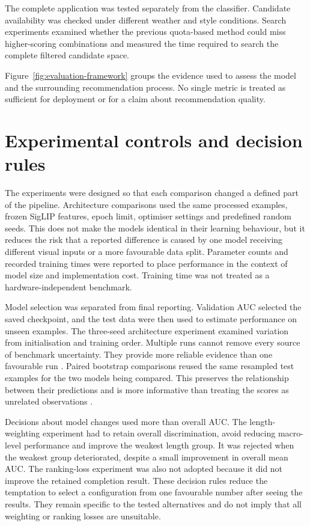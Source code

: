 The complete application was tested separately from the classifier. Candidate
availability was checked under different weather and style conditions. Search
experiments examined whether the previous quota-based method could miss
higher-scoring combinations and measured the time required to search the
complete filtered candidate space.

Figure~\ref{fig:evaluation-framework} groups the evidence used to assess the
model and the surrounding recommendation process. No single metric is treated
as sufficient for deployment or for a claim about recommendation quality.



\section{Experimental controls and decision rules}

The experiments were designed so that each comparison changed a defined part
of the pipeline. Architecture comparisons used the same processed examples,
frozen SigLIP features, epoch limit, optimiser settings and predefined random
seeds. This does not make the models identical in their learning behaviour,
but it reduces the risk that a reported difference is caused by one model
receiving different visual inputs or a more favourable data split. Parameter
counts and recorded training times were reported to place performance in the
context of model size and implementation cost. Training time was not treated
as a hardware-independent benchmark.

Model selection was separated from final reporting. Validation AUC selected
the saved checkpoint, and the test data were then used to estimate performance
on unseen examples. The three-seed architecture experiment examined variation
from initialisation and training order. Multiple runs cannot remove every
source of benchmark uncertainty. They provide more reliable evidence than one
favourable run \parencite{bouthillier2021variance}. Paired bootstrap
comparisons reused the same resampled test examples for the two models being
compared. This preserves the relationship between their predictions and is
more informative than treating the scores as unrelated observations
\parencite{dietterich1998tests,efron1994bootstrap}.

Decisions about model changes used more than overall AUC. The length-weighting
experiment had to retain overall discrimination, avoid reducing macro-level
performance and improve the weakest length group. It was rejected when the
weakest group deteriorated, despite a small improvement in overall mean AUC.
The ranking-loss experiment was also not adopted because it did not improve
the retained completion result. These decision rules reduce the temptation to
select a configuration from one favourable number after seeing the results.
They remain specific to the tested alternatives and do not imply that all
weighting or ranking losses are unsuitable.

